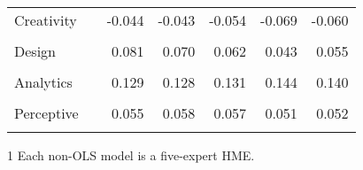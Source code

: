 \documentclass[12pt]{article}
\begin{document}
\begin{table}
\begin{threeparttable}
\begin{tabular}[l]{l l r r r r r}
      Creativity  &   & -0.044  & -0.043  & -0.054  & -0.069  & -0.060       \\
                  &   &   &   &   &   &        \\[0.3cm]
       
      Design      &   & 0.081  & 0.070  & 0.062  & 0.043  & 0.055       \\
                  &   &   &   &   &   &        \\[0.3cm]
        
      Analytics   &   & 0.129  & 0.128  & 0.131  & 0.144  & 0.140       \\
                  &   &   &   &   &   &        \\[0.3cm]
       
      Perceptive  &   & 0.055  & 0.058  & 0.057  & 0.051  & 0.052       \\
                  &   &   &   &   &   &        \\[0.3cm]


      \hline
    \end{tabular}
    \begin{tablenotes}
      \item[1]{\footnotesize Each non-OLS model is a five-expert HME.}
    \end{tablenotes} \label{tbl:model_marg_effects_2}
  \end{threeparttable}
\end{table}
\end{document}
